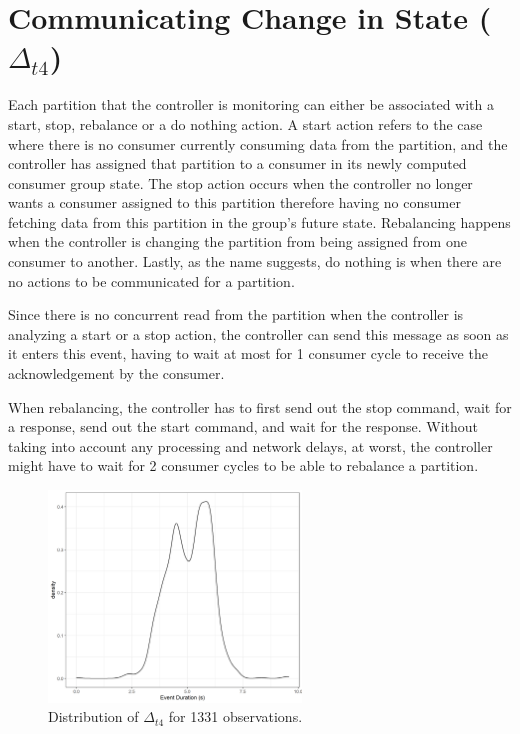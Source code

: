 \section{Communicating Change in State ($\Delta_{t4}$)}

Each partition that the controller is monitoring can either be associated with a
start, stop, rebalance or a do nothing action. A start action refers to the case
where there is no consumer currently consuming data from the partition, and the
controller has assigned that partition to a consumer in its newly computed
consumer group state. The stop action occurs when the controller no longer wants
a consumer assigned to this partition therefore having no consumer fetching data
from this partition in the group's future state. Rebalancing happens when the
controller is changing the partition from being assigned from one consumer to
another. Lastly, as the name suggests, do nothing is when there are no actions to
be communicated for a partition. 

Since there is no concurrent read from the partition when the controller is
analyzing a start or a stop action, the controller can send this message as soon
as it enters this event, having to wait at most for 1 consumer cycle to receive
the acknowledgement by the consumer. 

When rebalancing, the controller has to first send out the stop command, wait
for a response, send out the start command, and wait for the response. Without
taking into account any processing and network delays, at worst, the controller
might have to wait for 2 consumer cycles to be able to rebalance a partition.

\begin{figure}[htb!]
\centering
\includegraphics[width=0.6\textwidth]{images/integration/delta4.png}
\caption{
    Distribution of $\Delta_{t4}$ for 1331 observations.
}
\label{fig:controller_result_change_state}
\end{figure}

